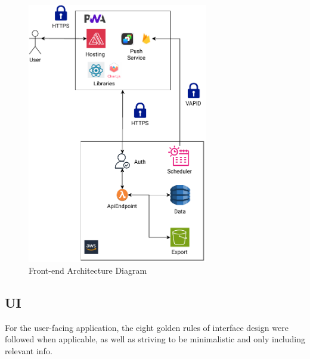 \begin{figure}
    
    \centering
    \includegraphics[width=0.7\textwidth,keepaspectratio]{../images/frontend.pdf}
    \caption{Front-end Architecture Diagram}
    \label{fig:frontend}
    
\end{figure}
\subsection{UI}
For the user-facing application, the eight golden rules of interface design \cite{goldenRulesUI} were followed when applicable, as well as striving to be minimalistic and only including relevant info.

